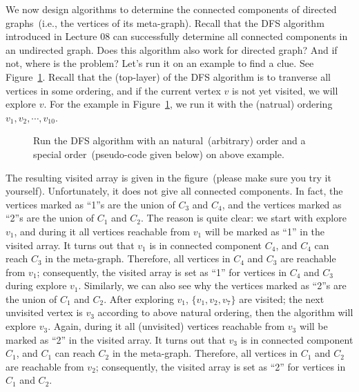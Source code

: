 We now design algorithms to determine the connected components of directed graphs~(i.e., the vertices of its meta-graph).
Recall that the DFS algorithm introduced in Lecture 08 can successfully determine all connected components in an undirected graph.
Does this algorithm also work for directed graph? And if not, where is the problem? 
Let's run it on an example to find a clue. See Figure~\ref{fig:dfs-meta}.
Recall that the (top-layer) of the DFS algorithm is to tranverse all vertices in some ordering,
and if the current vertex $v$ is not yet visited, we will explore $v$.
For the example in Figure~\ref{fig:dfs-meta}, we run it with the (natrual) ordering $v_1, v_2, \cdots, v_{10}$.

\begin{figure}[h!]
\centering{}
\caption{Run the DFS algorithm with an natural~(arbitrary) order
and a special order~(pseudo-code given below) on above example.}
\label{fig:dfs-meta}
\end{figure}

The resulting visited array is given in the figure~(please make sure you try it yourself).
Unfortunately, it does not give all connected components. In fact, the vertices marked as ``1''s are the union of $C_3$ and $C_4$,
and the vertices marked as ``2''s are the union of $C_1$ and $C_2$.
The reason is quite clear: we start with explore $v_1$, and during it all vertices reachable from $v_1$ will be marked as ``1'' in the visited array.
It turns out that $v_1$ is in connected component $C_4$, and $C_4$ can reach $C_3$ in the meta-graph.
Therefore, all vertices in $C_4$ and $C_3$ are reachable from $v_1$; consequently, the visited array is set as ``1'' for 
vertices in $C_4$ and $C_3$ during explore $v_1$. 
Similarly, we can also see why the vertices marked as ``2''s are the union of $C_1$ and $C_2$.
After exploring $v_1$, $\{v_1,v_2,v_7\}$ are visited; the next unvisited vertex is $v_3$ according to above natural ordering,
then the algorithm will explore $v_3$.
Again, during it all (unvisited) vertices reachable from $v_3$ will be marked as ``2'' in the visited array.
It turns out that $v_3$ is in connected component $C_1$, and $C_1$ can reach $C_2$ in the meta-graph.
Therefore, all vertices in $C_1$ and $C_2$ are reachable from $v_2$;
consequently, the visited array is set as ``2'' for 
vertices in $C_1$ and $C_2$. 

